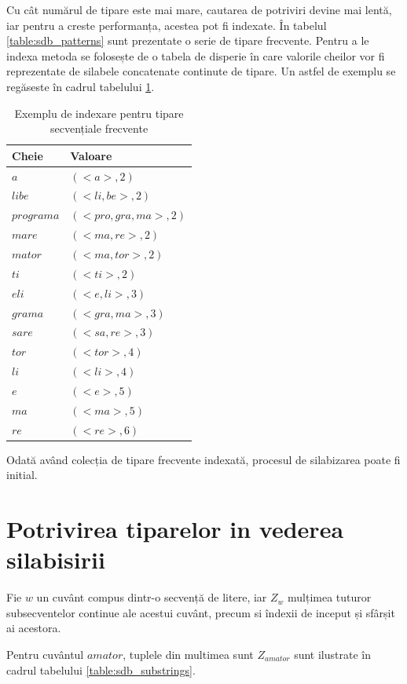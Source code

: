 Cu cât numărul de tipare este mai mare, cautarea de potriviri devine mai lentă, iar pentru a creste performanța, acestea pot fi indexate. În tabelul \ref{table:sdb_patterns} sunt prezentate o serie de tipare frecvente. Pentru a le indexa metoda se folosește de o tabela de disperie în care valorile cheilor vor fi reprezentate de silabele concatenate continute de tipare. Un astfel de exemplu se regăseste în cadrul tabelului \ref{table:sdb_index}. 

\begin{table}[h!]
\centering    
\begin{tabular}{|l|l|}    
\hline      
Cheie & Valoare\\
\hline
$a$ 		& $(<a>, 2)$  \\
$libe$ 		& $(<li, be>, 2)$  \\
$programa$ 	& $(<pro, gra, ma>, 2)$  \\
$mare$ 		& $(<ma, re>, 2)$  \\
$mator$ 	& $(<ma, tor>, 2)$  \\
$ti$ 		& $(<ti>, 2)$  \\
$eli$ 		& $(<e, li>, 3)$  \\
$grama$ 	& $(<gra, ma>, 3)$  \\
$sare$ 		& $(<sa, re>, 3)$  \\
$tor$ 		& $(<tor>, 4)$  \\
$li$ 		& $(<li>, 4)$  \\
$e$ 		& $(<e>, 5)$  \\
$ma$ 		& $(<ma>, 5)$  \\
$re$ 		& $(<re>, 6)$  \\
\hline
\end{tabular}
\caption{Exemplu de indexare pentru tipare secvențiale frecvente}
\label{table:sdb_index}               
\end{table}  

Odată având colecția de tipare frecvente indexată, procesul de silabizarea poate fi initial. 
 
\section{Potrivirea tiparelor in vederea silabisirii}

Fie $w$ un cuvânt compus dintr-o secvență de litere, iar $Z_w$ mulțimea tuturor subsecventelor continue ale acestui cuvânt, precum si îndexii de inceput și sfârșit ai acestora.

\begin{ex}
Pentru cuvântul $amator$, tuplele din multimea sunt $Z_{amator}$ sunt ilustrate în cadrul tabelului \ref{table:sdb_substrings}. 
\end{ex}


